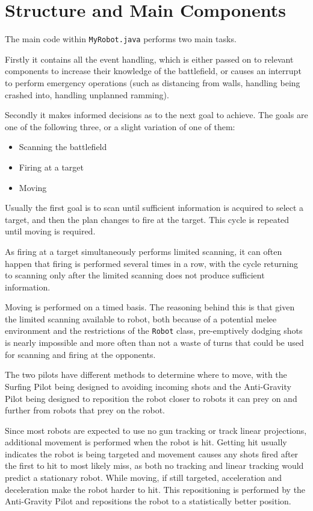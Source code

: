 \documentclass[11pt]{report}
\begin{document}
\section{Structure and Main Components}
The main code within \texttt{MyRobot.java} performs two main tasks.

Firstly it contains all the event handling, which is either passed on to relevant components to increase their knowledge of the battlefield, or causes an interrupt to perform emergency operations (such as distancing from walls, handling being crashed into, handling unplanned ramming).

Secondly it makes informed decisions as to the next goal to achieve. The goals are one of the following three, or a slight variation of one of them:
\begin{itemize}
	\item Scanning the battlefield
	\item Firing at a target
	\item Moving
\end{itemize}

Usually the first goal is to scan until sufficient information is acquired to select a target, and then the plan changes to fire at the target. This cycle is repeated until moving is required.

As firing at a target simultaneously performs limited scanning, it can often happen that firing is performed several times in a row, with the cycle returning to scanning only after the limited scanning does not produce sufficient information.

Moving is performed on a timed basis. The reasoning behind this is that given the limited scanning available to robot, both because of a potential melee environment and the restrictions of the \texttt{Robot} class, pre-emptively dodging shots is nearly impossible and more often than not a waste of turns that could be used for scanning and firing at the opponents.

The two pilots have different methods to determine where to move, with the Surfing Pilot being designed to avoiding incoming shots and the Anti-Gravity Pilot being designed to reposition the robot closer to robots it can prey on and further from robots that prey on the robot.

Since most robots are expected to use no gun tracking or track linear projections, additional movement is performed when the robot is hit. Getting hit usually indicates the robot is being targeted and movement causes any shots fired after the first to hit to most likely miss, as both no tracking and linear tracking would predict a stationary robot. While moving, if still targeted, acceleration and deceleration make the robot harder to hit. This repositioning is performed by the Anti-Gravity Pilot and repositions the robot to a statistically better position.
\end{document}

